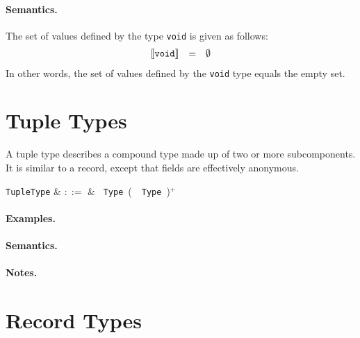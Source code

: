 \paragraph{Semantics.}  The set of values defined by the type
\lstinline{void} is given as follows:
\begin{displaymath}
\begin{array}{rcl}
\llbracket{\tt void}\rrbracket & = & \emptyset\\
\end{array}
\end{displaymath}
In other words, the set of values defined by the \lstinline{void} type
equals the empty set.  


\section{Tuple Types}

A tuple type describes a compound type made up of two or more subcomponents. It is similar to a record, except that fields are effectively anonymous.

\begin{syntax}
  \verb+TupleType+ & $::=$ & \token{(}\ \verb+Type+\ \big(\ \token{,}\
  \verb+Type+\ \big)$^+$\ \token{)}\\
\end{syntax}

\paragraph{Examples.}

\paragraph{Semantics.}

\paragraph{Notes.}


\section{Record Types}

